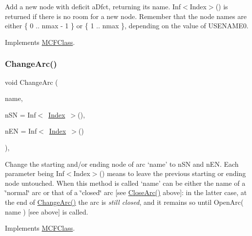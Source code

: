 Add a new node with deficit a\+Dfct, returning its name. Inf$<$\+Index$>$() is returned if there is no room for a new node. Remember that the node names are either \{ 0 .. nmax -\/ 1 \} or \{ 1 .. nmax \}, depending on the value of U\+S\+E\+N\+A\+M\+E0. 

Implements \mbox{\hyperlink{class_m_c_f_class_a6d58679267d8b620cc3337583dab4626}{M\+C\+F\+Class}}.

\mbox{\label{class_m_c_f_cplex_adbf1afd5cc24e1b5094f95945bd8e454}} 
\subsubsection{\texorpdfstring{Change\+Arc()}{ChangeArc()}}
{\footnotesize\ttfamily void Change\+Arc (\begin{DoxyParamCaption}\item[{\mbox{\hyperlink{class_m_c_f_class_a76aaabb20535c51a2752b93f6c38fe54}{c\+Index}}}]{name,  }\item[{\mbox{\hyperlink{class_m_c_f_class_a76aaabb20535c51a2752b93f6c38fe54}{c\+Index}}}]{n\+SN = {\ttfamily Inf$<$~\mbox{\hyperlink{class_m_c_f_class_ad53d6229d7ec28555a9c9c2fd9abf773}{Index}}~$>$()},  }\item[{\mbox{\hyperlink{class_m_c_f_class_a76aaabb20535c51a2752b93f6c38fe54}{c\+Index}}}]{n\+EN = {\ttfamily Inf$<$~\mbox{\hyperlink{class_m_c_f_class_ad53d6229d7ec28555a9c9c2fd9abf773}{Index}}~$>$()} }\end{DoxyParamCaption})\hspace{0.3cm}{\ttfamily [override]}, {\ttfamily [virtual]}}

Change the starting and/or ending node of arc `name' to n\+SN and n\+EN. Each parameter being Inf$<$\+Index$>$() means to leave the previous starting or ending node untouched. When this method is called `name' can be either the name of a \char`\"{}normal\char`\"{} arc or that of a \char`\"{}closed\char`\"{} arc \mbox{[}see \mbox{\hyperlink{class_m_c_f_cplex_a4a964ce79159307998f5acd0018d01b1}{Close\+Arc()}} above\mbox{]}\+: in the latter case, at the end of \mbox{\hyperlink{class_m_c_f_cplex_adbf1afd5cc24e1b5094f95945bd8e454}{Change\+Arc()}} the arc is {\itshape still closed}, and it remains so until Open\+Arc( name ) \mbox{[}see above\mbox{]} is called. 

Implements \mbox{\hyperlink{class_m_c_f_class_aef2d28b0b0a2420d6b8b7093d827fa67}{M\+C\+F\+Class}}.

